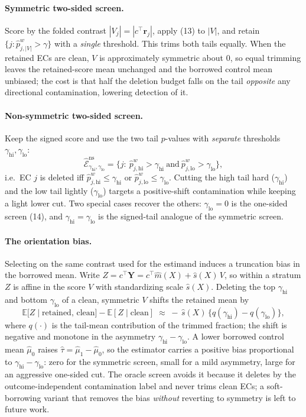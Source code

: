 \documentclass[11pt]{article}
\newcommand{\Exp}{\mathbb{E}}
\begin{document}
\paragraph{Symmetric two-sided screen.} Score by the folded contrast $|V_j|=|c^{\top}\bm r_j|$, apply (13) to $|V|$, and retain $\{j:\widehat p_{j,|V|}^{w}>\gamma\}$ with a \emph{single} threshold. This trims both tails equally. When the retained ECs are clean, $V$ is approximately symmetric about $0$, so equal trimming leaves the retained-score mean unchanged and the borrowed control mean unbiased; the cost is that half the deletion budget falls on the tail \emph{opposite} any directional contamination, lowering detection of it.

\paragraph{Non-symmetric two-sided screen.} Keep the signed score and use the two tail $p$-values with \emph{separate} thresholds $\gamma_{\mathrm{hi}},\gamma_{\mathrm{lo}}$:
\[
\widehat{\mathcal E}_{\gamma_{\mathrm{hi}},\gamma_{\mathrm{lo}}}^{\mathrm{ns}}
=
\bigl\{j:\ \widehat p_{j,\mathrm{hi}}^{w}>\gamma_{\mathrm{hi}}\ \text{and}\ \widehat p_{j,\mathrm{lo}}^{w}>\gamma_{\mathrm{lo}}\bigr\},
\]
i.e.\ EC $j$ is deleted iff $\widehat p_{j,\mathrm{hi}}^{w}\le\gamma_{\mathrm{hi}}$ or $\widehat p_{j,\mathrm{lo}}^{w}\le\gamma_{\mathrm{lo}}$. Cutting the high tail hard ($\gamma_{\mathrm{hi}}$) and the low tail lightly ($\gamma_{\mathrm{lo}}$) targets a positive-shift contamination while keeping a light lower cut. Two special cases recover the others: $\gamma_{\mathrm{lo}}{=}0$ is the one-sided screen (14), and $\gamma_{\mathrm{hi}}{=}\gamma_{\mathrm{lo}}$ is the signed-tail analogue of the symmetric screen.

\paragraph{The orientation bias.} Selecting on the same contrast used for the estimand induces a truncation bias in the borrowed mean. Write $Z=c^{\top}\bm Y=c^{\top}\widehat m(X)+\widehat s(X)\,V$, so within a stratum $Z$ is affine in the score $V$ with standardizing scale $\widehat s(X)$. Deleting the top $\gamma_{\mathrm{hi}}$ and bottom $\gamma_{\mathrm{lo}}$ of a clean, symmetric $V$ shifts the retained mean by
\[
\Exp\bigl[Z\mid\text{retained, clean}\bigr]-\Exp[Z\mid\text{clean}]
\;\approx\;-\,\widehat s(X)\,\bigl\{q(\gamma_{\mathrm{hi}})-q(\gamma_{\mathrm{lo}})\bigr\},
\]
where $q(\cdot)$ is the tail-mean contribution of the trimmed fraction; the shift is negative and monotone in the asymmetry $\gamma_{\mathrm{hi}}-\gamma_{\mathrm{lo}}$. A lower borrowed control mean $\widehat\mu_0$ raises $\widehat\tau=\widehat\mu_1-\widehat\mu_0$, so the estimator carries a positive bias proportional to $\gamma_{\mathrm{hi}}-\gamma_{\mathrm{lo}}$: zero for the symmetric screen, small for a mild asymmetry, large for an aggressive one-sided cut. The oracle screen avoids it because it deletes by the outcome-independent contamination label and never trims clean ECs; a soft-borrowing variant that removes the bias \emph{without} reverting to symmetry is left to future work.
\end{document}
